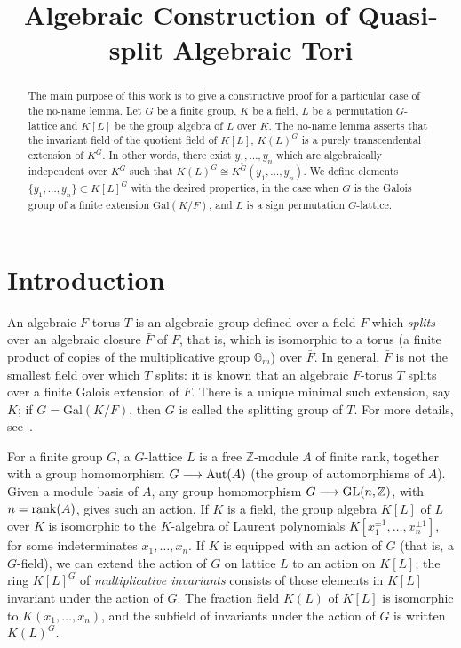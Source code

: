 \documentclass[12pt]{article}
\title{Algebraic Construction of Quasi-split Algebraic Tori}
\author{}
\theoremstyle{plain}
\newcommand{\Z}{\ensuremath{\mathbb{Z}}}
\begin{document}
\maketitle


\begin{abstract}

The main purpose of this work is to give a constructive proof for a 
particular case of the no-name lemma. Let $G$ be a
finite group, $K$ be a field, $L$ be a permutation $G$-lattice 
and $K[L]$ be the group algebra of $L$ over
$K$. The no-name lemma asserts that the invariant field of the
quotient field of $K[L]$, $K(L)^G$ is a purely transcendental
extension of $K^G$. In other words, there exist $y_1, \ldots , y_n$
which are algebraically independent over $K^G$ such that $K(L)^G \cong
K^G(y_1, \ldots , y_n)$.  We define elements $\lbrace y_1, \ldots, y_n
\rbrace \subset K[L]^G$ with the desired properties, in the case when
$G$ is the Galois group of a finite extension $\mathrm{Gal}(K/F)$, and
$L$ is a sign permutation $G$-lattice.
\end{abstract}

\section{Introduction}


An algebraic $F$-torus $T$ is an algebraic group defined over a field
$F$ which {\em splits} over an algebraic closure $\bar F$ of $F$, that
is, which is isomorphic to a torus (a finite product of copies of the
multiplicative group $\mathbb{G}_m$) over $\bar{F}$. In general,
$\bar{F}$ is not the smallest field over which $T$ splits: it is known
that an algebraic $F$-torus $T$ splits over a finite Galois extension
of $F$. There is a unique minimal such extension, say $K$; if $G =
\mathrm{Gal}(K/F)$, then $G$ is called the splitting group of $T$. For
more details, 
see~\cite[p. 27]{Voskresenskii}.

For a finite group $G$, a $G$-lattice $L$ is a free $\Z$-module $A$ of
finite rank, together with a group homomorphism $G \longrightarrow
{\rm Aut}(A)$ (the group of automorphisms of $A$). Given a module
basis of $A$, any group homomorphism $G \longrightarrow {\rm
  GL}(n,\Z)$, with $n={\rm rank}(A)$, gives such an action.  If $K$ is
a field, the group algebra $K[L]$ of $L$ over $K$ is isomorphic to the
$K$-algebra of Laurent polynomials $K[x_1^{\pm 1},\dots,x_n^{\pm 1}]$,
for some indeterminates $x_1,\dots,x_n$.  If $K$ is equipped with an
action of $G$ (that is, a $G$-field), we can extend the action of $G$
on lattice $L$ to an action on $K[L]$; the ring $K[L]^G$ of {\em
  multiplicative invariants} consists of those elements in $K[L]$
invariant under the action of $G$. The fraction field $K(L)$ of $K[L]$
is isomorphic to $K(x_1,\dots,x_n)$, and the subfield of invariants
under the action of $G$ is written $K(L)^G$.
\end{document}
